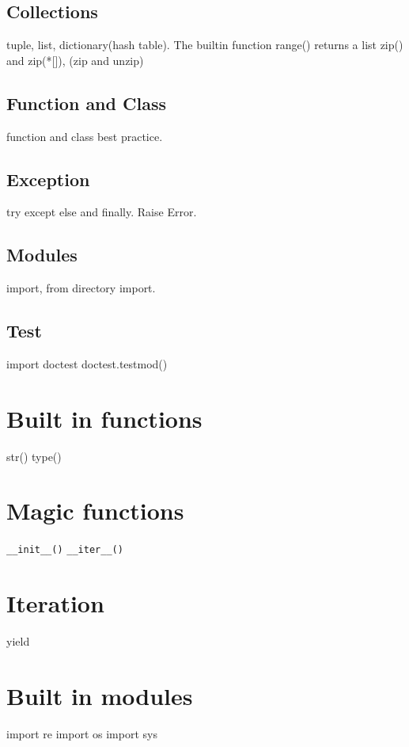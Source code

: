 \documentclass{article}
\begin{document}
\subsection{Collections}
tuple, list, dictionary(hash table). 
The builtin function range() returns a list
zip() and zip(*[]), (zip and unzip)

\subsection{Function and Class}
function and class best practice.   

\subsection{Exception}
try except else and finally. Raise Error.   

\subsection{Modules}
import, from directory import.  

\subsection{Test}
import doctest
    doctest.testmod()

\section{Built in functions}
str()
type()

\section{Magic functions}
\verb/__init__()/
\verb/__iter__()/

\section{Iteration}
yield

\section{Built in modules}
import re
import os
import sys

\end{document}

